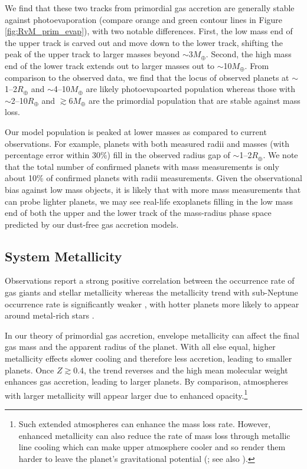 \documentclass[twocolumn]{aastex631}
\begin{document}
We find that these two tracks from primordial gas accretion are generally stable against photoevaporation (compare orange and green contour lines in Figure \ref{fig:RvM_prim_evap}), with two notable differences. First, the low mass end of the upper track is carved out and move down to the lower track, shifting the peak of the upper track to larger masses beyond $\sim$3$M_\oplus$. Second, the high mass end of the lower track extends out to larger masses out to $\sim$10$M_\oplus$. From comparison to the observed data, we find that the locus of observed planets at $\sim$1--2$R_\oplus$ and $\sim$4--10$M_\oplus$ are likely photoevapoarted population whereas those with $\sim$2--10$R_\oplus$ and $\gtrsim$6$M_\oplus$ are the primordial population that are stable against mass loss.

Our model population is peaked at lower masses as compared to current observations. For example, planets with both measured radii and masses (with percentage error within 30\%) fill in the observed radius gap of $\sim$1--2$R_\oplus$. We note that the total number of confirmed planets with mass measurements is only about 10\% of confirmed planets with radii measurements. Given the observational bias against low mass objects, it is likely that with more mass measurements that can probe lighter planets, we may see real-life exoplanets filling in the low mass end of both the upper and the lower track of the mass-radius phase space predicted by our dust-free gas accretion models.

\subsection{System Metallicity}

Observations report a strong positive correlation between the occurrence rate of gas giants and stellar metallicity \citep[e.g.,][]{Fischer05} whereas the metallicity trend with sub-Neptune occurrence rate is significantly weaker \citep[e.g.,][]{Wang15,Petigura18,Wilson21}, with hotter planets more likely to appear around metal-rich stars \citep[e.g.,][]{Wilson18}.

In our theory of primordial gas accretion, envelope metallicity can affect the final gas mass and the apparent radius of the planet. With all else equal, higher metallicity effects slower cooling and therefore less accretion, leading to smaller planets. Once $Z \gtrsim 0.4$, the trend reverses and the high mean molecular weight enhances gas accretion, leading to larger planets. By comparison, atmospheres with larger metallicity will appear larger due to enhanced opacity.\footnote{Such extended atmospheres can enhance the mass loss rate. However, enhanced metallicity can also reduce the rate of mass loss through metallic line cooling which can make upper atmosphere cooler and so render them harder to leave the planet's gravitational potential (\citealt{Owen_Murray-Clay18}; see also \citealt{Mordasini20}).}
\end{document}
